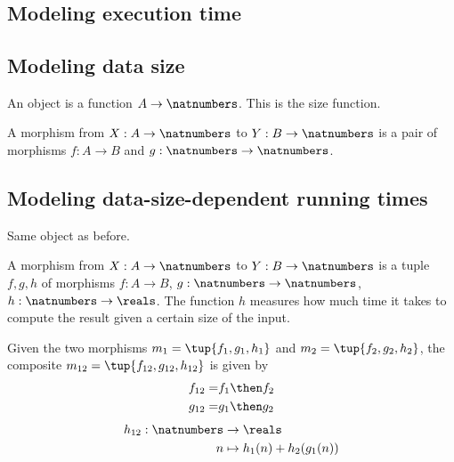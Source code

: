

\section{}



\subsection{Modeling execution time}


\subsection{Modeling data size}

An object is a function $A \to \natnumbers $. This is the size function.


A morphism from $X: A \to \natnumbers $ to $Y: B \to \natnumbers$ is a pair of morphisms
$f: A \to B$ and $g: \natnumbers \to \natnumbers$.


\subsection{Modeling data-size-dependent running times}

Same object as before.


A morphism from $X: A \to \natnumbers $ to $Y: B \to \natnumbers$ is a tuple $f, g, h$ of morphisms
$f: A \to B$, $g: \natnumbers \to \natnumbers$, $h: \natnumbers \to \reals$. The function $h$ measures
how much time it takes to compute the result given a certain size of the input.

Given the two morphisms $m_1 = \tup{f_1, g_1, h_1}$ and $m_2 = \tup{f_2, g_2, h_2}$, the composite
$m_{12} = \tup{f_{12}, g_{12}, h_{12}}$ is given by
%
\begin{eqnarray}
  f_{12} =& f_1 \then f_2 \\
  g_{12} =& g_1 \then g_2 \\
\end{eqnarray}
%
\begin{eqnarray}
  h_{12} : \natnumbers & \to \reals \\
  n & \mapsto h_1(n) + h_2( g_1 (n))
\end{eqnarray}
